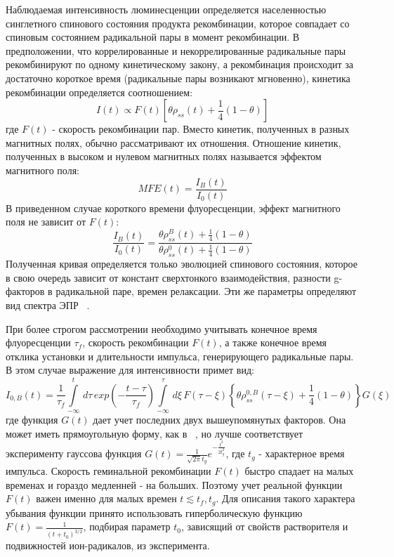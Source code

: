 \documentclass[14pt,titlepage]{extarticle}
\begin{document}
Наблюдаемая интенсивность люминесценции определяется населенностью синглетного спинового состояния продукта рекомбинации, которое совпадает со спиновым состоянием радикальной пары в момент рекомбинации. В предположении, что коррелированные и некоррелированные радикальные пары рекомбинируют по одному кинетическому закону, а рекомбинация происходит за достаточно короткое время (радикальные пары возникают мгновенно), кинетика рекомбинации определяется соотношением:
\begin{equation} I(t) \propto F(t) \left[\theta \rho_{ss}(t)+\frac{1}{4} (1-\theta)\right] \end{equation}
где \(F(t)\) - скорость рекомбинации пар.
Вместо кинетик, полученных в разных магнитных полях, обычно рассматривают их отношения. Отношение кинетик, полученных в высоком и нулевом магнитных полях называется эффектом магнитного поля:
\begin{equation} {MFE}(t)=\frac{I_B(t)}{I_0(t)} \end{equation}
В приведенном случае короткого времени флуоресценции, эффект магнитного поля не зависит от \(F(t)\):
\begin{equation} \frac{I_B(t)}{I_0(t)}=\frac{\theta \rho_{ss}^B(t)+\frac{1}{4} (1-\theta)}{\theta \rho_{ss}^0(t)+\frac{1}{4} (1-\theta)} \end{equation}
Полученная кривая определяется только эволюцией спинового состояния, которое в свою очередь зависит от констант сверхтонкого взаимодействия, разности g-факторов в радикальной паре, времен релаксации. Эти же параметры определяют вид спектра ЭПР ~\cite{SpectroscopicCapabilities}. 

При более строгом рассмотрении необходимо учитывать конечное время флуоресценции \( \tau_f \), скорость рекомбинации \(F(t)\), а также конечное время отклика установки и длительности импульса, генерирующего радикальные пары. В этом случае выражение для интенсивности примет вид:
\begin{equation} I_{0,B}(t)=\frac{1}{\tau_f} \int \limits_{-\infty}^{t}\, d\tau\, exp\left ( - \frac{t-\tau}{\tau_f} \right ) \int \limits_{-\infty}^{\tau} \, d\xi \, F(\tau-\xi) \left \lbrace \theta \rho_{ss}^{0,B}(\tau-\xi)+\frac{1}{4} (1-\theta) \right \rbrace G(\xi) \end{equation}
где функция \(G(t)\) дает учет последних двух вышеупомянутых факторов. Она может иметь прямоугольную форму, как в  ~\cite{bagryansky:224503}, но лучше соответствует эксперименту гауссова функция \( G(t)= \frac{1}{\sqrt{2\pi}t_g}e^{-\frac{t^2}{2 t_g^2}} \), где \(t_g\) - характерное время импульса. Скорость геминальной рекомбинации \(F(t)\) быстро спадает на малых временах и гораздо медленней - на больших. Поэтому учет реальной функции \(F(t)\) важен именно для малых времен  \( t \lesssim t_f,t_g \). Для описания такого характера убывания функции принято использовать гиперболическую функцию \(F(t)=\frac{1}{(t+t_0)^{3/2}}\), подбирая параметр \(t_0\), зависящий от свойств растворителя и подвижностей ион-радикалов, из эксперимента.
\end{document}
